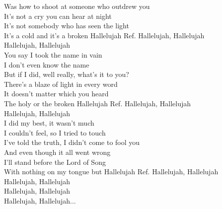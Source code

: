 Was how to shoot at someone who outdrew you\\
It’s not a cry you can hear at night\\
It’s not somebody who has seen the light\\
It’s a cold and it’s a broken Hallelujah
\hops
Ref. Hallelujah, Hallelujah\\
 Hallelujah, Hallelujah\\
\hops
You say I took the name in vain\\
I don't even know the name\\
But if I did, well really, what's it to you?\\
There's a blaze of light in every word\\
It doesn't matter which you heard\\
The holy or the broken Hallelujah
\hops
Ref. Hallelujah, Hallelujah\\
 Hallelujah, Hallelujah\\
\hops
I did my best, it wasn't much\\
I couldn't feel, so I tried to touch\\
I've told the truth, I didn't come to fool you\\
And even though it all went wrong\\
I'll stand before the Lord of Song\\
With nothing on my tongue but Hallelujah
\hops
Ref. Hallelujah, Hallelujah\\
 Hallelujah, Hallelujah\\
 Hallelujah, Hallelujah\\
 Hallelujah, Hallelujah...
